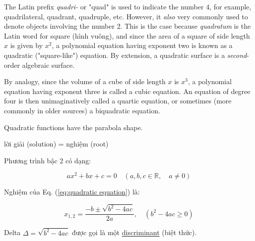 The Latin prefix \textit{quadri-} or "quad" is used to indicate the number 4, for example, quadrilateral, quadrant, quadruple, etc. However, it \textit{also} very commonly used to denote objects involving the number 2. This is the case because \textit{quadratum} is the Latin word for square (hình vuông), and since the area of a square of side length $x$ is given by $x^2$, a polynomial equation having exponent two is known as a quadratic ("square-like") equation. By extension, a quadratic surface is a \textit{second}-order algebraic surface.

By analogy, since the volume of a cube of side length $x$ is $x^3$, a polynomial equation having exponent three is called a cubic equation. An equation of degree four is then unimaginatively called a quartic equation, or sometimes (more commonly in older sources) a biquadratic equation.

Quadratic functions have the parabola shape.


lời giải (solution) = nghiệm (root)

Phương trình bậc 2 có dạng: 

\begin{equation}
  ax^{2}+bx+c=0\quad (a, b, c \in \mathbb{R}, \quad a \ne 0)
  \label{eq:quadratic equation}
\end{equation}

Nghiệm của Eq. (\ref{eq:quadratic equation}) là:

\[x_{1,2}=\frac{-b \pm \sqrt{b^{2}-4ac} }{2a},\quad (b^{2}-4ac \geq0)\]

Delta $\Delta=\sqrt{b^{2}-4ac}$ được gọi là một \href{https://en.wikipedia.org/wiki/Discriminant}{discriminant} (biệt thức).

